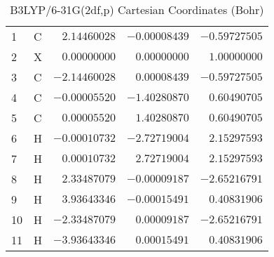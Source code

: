 \documentclass[10pt,oneside]{article}
\begin{document}
\begin{table}[h]
\centering
\caption{B3LYP/6-31G(2df,p) Cartesian Coordinates (Bohr)}
\begin{tabular}{llrrr}
\toprule
1  & C  & $ 2.14460028$ & $-0.00008439$ & $-0.59727505$ \\
2  & X  & $ 0.00000000$ & $ 0.00000000$ & $ 1.00000000$ \\
3  & C  & $-2.14460028$ & $ 0.00008439$ & $-0.59727505$ \\
4  & C  & $-0.00005520$ & $-1.40280870$ & $ 0.60490705$ \\
5  & C  & $ 0.00005520$ & $ 1.40280870$ & $ 0.60490705$ \\
6  & H  & $-0.00010732$ & $-2.72719004$ & $ 2.15297593$ \\
7  & H  & $ 0.00010732$ & $ 2.72719004$ & $ 2.15297593$ \\
8  & H  & $ 2.33487079$ & $-0.00009187$ & $-2.65216791$ \\
9  & H  & $ 3.93643346$ & $-0.00015491$ & $ 0.40831906$ \\
10 & H  & $-2.33487079$ & $ 0.00009187$ & $-2.65216791$ \\
11 & H  & $-3.93643346$ & $ 0.00015491$ & $ 0.40831906$ \\
\bottomrule
\end{tabular}
\end{table}
\end{document}
